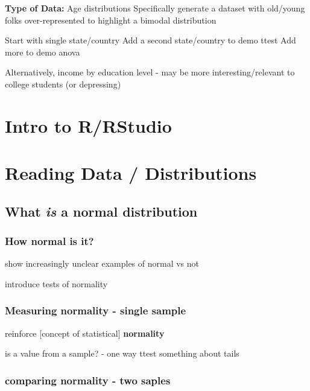 \documentclass[
]{book}
\begin{document}
\textbf{Type of Data:}
Age distributions
Specifically generate a dataset with old/young folks over-represented to highlight a bimodal distribution

Start with single state/country
Add a second state/country to demo ttest
Add more to demo anova

Alternatively, income by education level - may be more interesting/relevant to college students (or depressing)

\hypertarget{intro-to-rrstudio}{%
\section{Intro to R/RStudio}\label{intro-to-rrstudio}}

\hypertarget{reading-data-distributions}{%
\section{Reading Data / Distributions}\label{reading-data-distributions}}

\hypertarget{what-is-a-normal-distribution}{%
\subsection{\texorpdfstring{What \emph{is} a \textbf{normal distribution}}{What is a normal distribution}}\label{what-is-a-normal-distribution}}

\hypertarget{how-normal-is-it}{%
\subsubsection{How normal is it?}\label{how-normal-is-it}}

show increasingly unclear examples of normal vs not

introduce tests of normality

\hypertarget{measuring-normality---single-sample}{%
\subsubsection{Measuring normality - single sample}\label{measuring-normality---single-sample}}

reinforce {[}concept of statistical{]} \textbf{normality}

is a value from a sample? - one way ttest
something about tails

\hypertarget{comparing-normality---two-saples}{%
\subsubsection{comparing normality - two saples}\label{comparing-normality---two-saples}}
\end{document}
